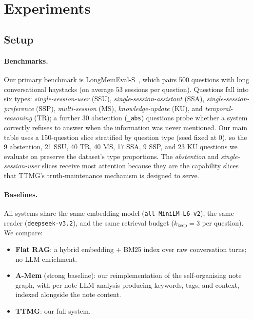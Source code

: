 \section{Experiments}
\label{sec:exp}

\subsection{Setup}
\label{ssec:setup}

\paragraph{Benchmarks.}
Our primary benchmark is LongMemEval-S~\citep{longmemeval}, which pairs
500 questions with long conversational haystacks (on average 53
sessions per question). Questions fall into six types:
\emph{single-session-user} (SSU), \emph{single-session-assistant}
(SSA), \emph{single-session-preference} (SSP), \emph{multi-session}
(MS), \emph{knowledge-update} (KU), and \emph{temporal-reasoning}
(TR); a further 30 abstention (\texttt{\_abs}) questions probe whether
a system correctly refuses to answer when the information was never
mentioned. Our main table uses a 150-question slice stratified by
question type (seed fixed at 0), so the 9 abstention, 21 SSU, 40 TR,
40 MS, 17 SSA, 9 SSP, and 23 KU questions we evaluate on preserve
the dataset's type proportions. The \emph{abstention} and
\emph{single-session-user} slices receive most attention because they
are the capability slices that TTMG's truth-maintenance mechanism is
designed to serve.

\paragraph{Baselines.}
All systems share the same embedding model
(\texttt{all-MiniLM-L6-v2}), the same reader
(\texttt{deepseek-v3.2}), and the same retrieval budget ($k_{\text{keep}}
{=}3$ per question). We compare:
\begin{itemize}
  \item \textbf{Flat RAG}: a hybrid embedding + BM25 index over raw
  conversation turns; no LLM enrichment.
  \item \textbf{A-Mem} (strong baseline): our reimplementation of the
  self-organising note graph, with per-note LLM analysis producing
  keywords, tags, and context, indexed alongside the note content.
  \item \textbf{TTMG}: our full system.
\end{itemize}

